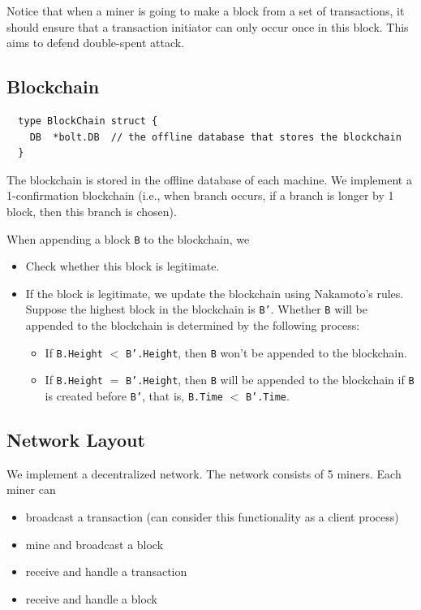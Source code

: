\documentclass[10pt]{homework}
\begin{document}
Notice that when a miner is going to make a block from a set of transactions, it should ensure that a transaction initiator can only occur once in this block. This aims to defend double-spent attack.

\subsection*{Blockchain}

\begin{lstlisting}
  type BlockChain struct {
    DB	*bolt.DB  // the offline database that stores the blockchain
  }
\end{lstlisting}

The blockchain is stored in the offline database of each machine. We implement a 1-confirmation blockchain (i.e., when branch occurs, if a branch is longer by 1 block, then this branch is chosen). 

When appending a block \texttt{B} to the blockchain, we 
\begin{itemize}
  \item Check whether this block is legitimate.
  \item If the block is legitimate, we update the blockchain using Nakamoto's rules. Suppose the highest block in the blockchain is \texttt{B'}. Whether \texttt{B} will be  appended to the blockchain is determined by the following process:
  \begin{itemize}
    \item If \texttt{B.Height} $<$ \texttt{B'.Height}, then \texttt{B} won't be appended to the blockchain.
    \item If \texttt{B.Height} $=$ \texttt{B'.Height}, then \texttt{B} will be appended to the blockchain if \texttt{B} is created before \texttt{B'}, that is, \texttt{B.Time} $<$ \texttt{B'.Time}.
  \end{itemize}
\end{itemize}


\subsection*{Network Layout}

We implement a decentralized network. The network consists of 5 miners. Each miner can
\begin{itemize}
  \item broadcast a transaction (can consider this functionality as a client process)
  \item mine and broadcast a block
  \item receive and handle a transaction
  \item receive and handle a block
\end{itemize}
\end{document}
